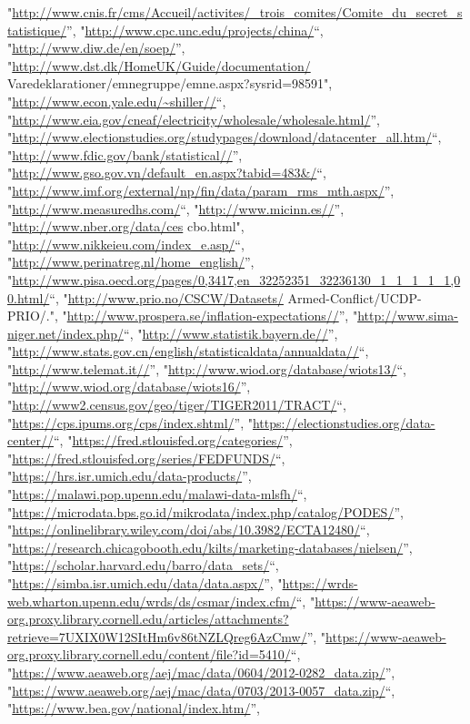 \documentclass[]{article}
\begin{document}
\begin{itemize}
  "\url{http://www.cnis.fr/cms/Accueil/activites/_trois_comites/Comite_du_secret_statistique/}'',
  "\url{http://www.cpc.unc.edu/projects/china/}``,
  "\url{http://www.diw.de/en/soep/}'',
  "\url{http://www.dst.dk/HomeUK/Guide/documentation/}
  Varedeklarationer/emnegruppe/emne.aspx?sysrid=98591",
  "\url{http://www.econ.yale.edu/~shiller//}``,
  "\url{http://www.eia.gov/cneaf/electricity/wholesale/wholesale.html/}'',
  "\url{http://www.electionstudies.org/studypages/download/datacenter_all.htm/}``,
  "\url{http://www.fdic.gov/bank/statistical//}'',
  "\url{http://www.gso.gov.vn/default_en.aspx?tabid=483\&/}``,
  "\url{http://www.imf.org/external/np/fin/data/param_rms_mth.aspx/}'',
  "\url{http://www.measuredhs.com/}``, "\url{http://www.micinn.es//}'',
  "\url{http://www.nber.org/data/ces} cbo.html",
  "\url{http://www.nikkeieu.com/index_e.asp/}``,
  "\url{http://www.perinatreg.nl/home_english/}'',
  "\url{http://www.pisa.oecd.org/pages/0,3417,en_32252351_32236130_1_1_1_1_1,00.html/}``,
  "\url{http://www.prio.no/CSCW/Datasets/} Armed-Conflict/UCDP-PRIO/.",
  "\url{http://www.prospera.se/inflation-expectations//}'',
  "\url{http://www.sima-niger.net/index.php/}``,
  "\url{http://www.statistik.bayern.de//}'',
  "\url{http://www.stats.gov.cn/english/statisticaldata/annualdata//}``,
  "\url{http://www.telemat.it//}'',
  "\url{http://www.wiod.org/database/wiots13/}``,
  "\url{http://www.wiod.org/database/wiots16/}'',
  "\url{http://www2.census.gov/geo/tiger/TIGER2011/TRACT/}``,
  "\url{https://cps.ipums.org/cps/index.shtml/}'',
  "\url{https://electionstudies.org/data-center//}``,
  "\url{https://fred.stlouisfed.org/categories/}'',
  "\url{https://fred.stlouisfed.org/series/FEDFUNDS/}``,
  "\url{https://hrs.isr.umich.edu/data-products/}'',
  "\url{https://malawi.pop.upenn.edu/malawi-data-mlsfh/}``,
  "\url{https://microdata.bps.go.id/mikrodata/index.php/catalog/PODES/}'',
  "\url{https://onlinelibrary.wiley.com/doi/abs/10.3982/ECTA12480/}``,
  "\url{https://research.chicagobooth.edu/kilts/marketing-databases/nielsen/}'',
  "\url{https://scholar.harvard.edu/barro/data_sets/}``,
  "\url{https://simba.isr.umich.edu/data/data.aspx/}'',
  "\url{https://wrds-web.wharton.upenn.edu/wrds/ds/csmar/index.cfm/}``,
  "\url{https://www-aeaweb-org.proxy.library.cornell.edu/articles/attachments?retrieve=7UXIX0W12SItHm6v86tNZLQreg6AzCmw/}'',
  "\url{https://www-aeaweb-org.proxy.library.cornell.edu/content/file?id=5410/}``,
  "\url{https://www.aeaweb.org/aej/mac/data/0604/2012-0282_data.zip/}'',
  "\url{https://www.aeaweb.org/aej/mac/data/0703/2013-0057_data.zip/}``,
  "\url{https://www.bea.gov/national/index.htm/}'',

\end{itemize}
\end{document}
